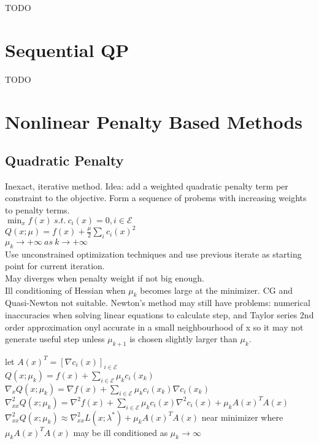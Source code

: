 \documentclass[8pt,letter]{article}
\begin{document}
\begin{multicols*}{2}
  TODO

  \vfill\null
  \pagebreak

  \section{Sequential QP}

  TODO

  \vfill\null
  \pagebreak
  
  \section{Nonlinear Penalty Based Methods}
  
  \subsection{Quadratic Penalty}
  
  Inexact, iterative method. Idea: add a weighted quadratic penalty term per constraint to the objective. Form a sequence of probems with increasing weights to penalty terms.\\
  
  $\min_x f(x)\ s.t.\ c_i(x)=0, i\in \mathcal{E}$\\
  $Q(x;\mu) = f(x) + \frac{\mu}{2} \sum_i c_i(x)^2$\\
  $\mu_k \rightarrow +\infty\ as\ k \rightarrow +\infty$\\

  Use unconstrained optimization techniques and use previous iterate as starting point for current iteration.\\
  
  May diverges when penalty weight if not big enough.\\

  Ill conditioning of Hessian when $\mu_k$ becomes large at the minimizer. CG and Quasi-Newton not suitable. Newton's method may still have problems: numerical inaccuracies when solving linear equations to calculate step, and Taylor series 2nd order approximation onyl accurate in a small neighbourhood of x so it may not generate useful step unless $\mu_{k+1}$ is chosen slightly larger than $\mu_k$.


  let $A(x)^T = [\nabla c_i(x)]_{i \in \mathcal{E}}$\\
  $Q(x; \mu_k) = f(x) + \sum_{i \in \mathcal{E}} \mu_k c_i(x_k)$\\
  $\nabla_x Q(x; \mu_k) = \nabla f(x) + \sum_{i \in \mathcal{E}} \mu_k c_i(x_k) \nabla c_i(x_k)$\\
  $\nabla_{xx}^2 Q(x; \mu_k) = \nabla^2 f(x) + \sum_{i \in \mathcal{E}} \mu_k c_i(x) \nabla^2 c_i(x) + \mu_k A(x)^TA(x)$\\
  $\nabla_{xx}^2 Q(x; \mu_k) \approx \nabla_{xx}^2 L(x; \lambda^*) + \mu_k A(x)^T A(x)$ near minimizer where $\mu_k A(x)^T A(x)$ may be ill conditioned as $\mu_k \rightarrow \infty$\\
  

\end{multicols*}
\end{document}
